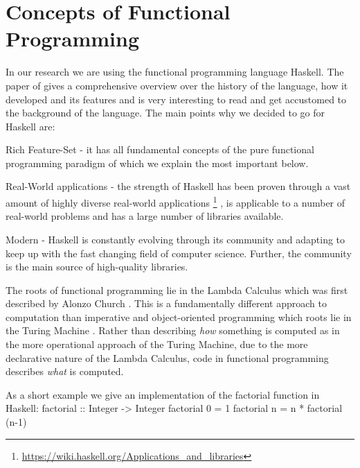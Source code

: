 \section{Concepts of Functional Programming}
In our research we are using the functional programming language Haskell. The paper of \citep{hudak_history_2007} gives a comprehensive overview over the history of the language, how it developed and its features and is very interesting to read and get accustomed to the background of the language. The main points why we decided to go for Haskell are:

\begin{itemize*}
	\item Rich Feature-Set - it has all fundamental concepts of the pure functional programming paradigm of which we explain the most important below.
	\item Real-World applications - the strength of Haskell has been proven through a vast amount of highly diverse real-world applications \footnote{\url{https://wiki.haskell.org/Applications_and_libraries}} \cite{hudak_history_2007}, is applicable to a number of real-world problems \cite{osullivan_real_2008} and has a large number of libraries available.
	\item Modern - Haskell is constantly evolving through its community and adapting to keep up with the fast changing field of computer science. Further, the community is the main source of high-quality libraries.
\end{itemize*}

The roots of functional programming lie in the Lambda Calculus which was first described by Alonzo Church \citep{church_unsolvable_1936}. This is a fundamentally different approach to computation than imperative and object-oriented programming which roots lie in the Turing Machine \citep{turing_computable_1937}. Rather than describing \textit{how} something is computed as in the more operational approach of the Turing Machine, due to the more declarative nature of the Lambda Calculus, code in functional programming describes \textit{what} is computed.

As a short example we give an implementation of the factorial function in Haskell:
factorial :: Integer -> Integer
factorial 0 = 1
factorial n = n * factorial (n-1)

